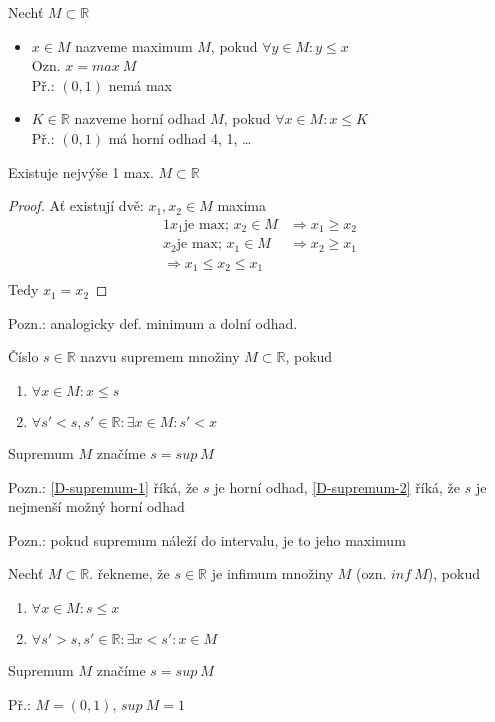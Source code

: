 \begin{definition}[Maximum]
	Nechť $M\subset\mathbb{R}$
	\begin{itemize}
		\item $x\in M$ nazveme maximum $M$, pokud $\forall y\in M: y\leq x$ \\
			Ozn. $x=max~M$ \\
			Př.: $(0,1)$ nemá max
		\item $K\in\mathbb{R}$ nazveme horní odhad $M$, pokud $\forall x\in M: x\leq K$ \\
			Př.: $(0,1)$ má horní odhad 4, 1, \dots
	\end{itemize}
\end{definition}

\begin{lemma}
	Existuje nejvýše 1 max. $M\subset\mathbb{R}$
\end{lemma}
\begin{proof}
	Ať existují dvě: $x_1, x_2\in M$ maxima
	\begin{alignat}{1}
		x_1 \text{je max; }x_2\in M &\Rightarrow x_1\geq x_2 \\
		x_2 \text{je max; }x_1\in M &\Rightarrow x_2\geq x_1 \\
		\Rightarrow x_1\leq x_2\leq x_1 \\
	\end{alignat}
	Tedy $x_1=x_2$
\end{proof}

Pozn.: analogicky def. minimum a dolní odhad.

\begin{definition}[Supremum]
	Číslo $s\in\mathbb{R}$ nazvu supremem množiny $M\subset\mathbb{R}$, pokud
	\begin{enumerate}[I]
		\item\label{D-supremum-1} $\forall x\in M: x\leq s$
		\item\label{D-supremum-2} $\forall s'<s, s'\in\mathbb{R}: \exists x\in M: s'<x$
	\end{enumerate}
	Supremum $M$ značíme $s=sup~M$
\end{definition}

Pozn.: \ref{D-supremum-1} říká, že $s$ je horní odhad, \ref{D-supremum-2} říká,
že $s$ je nejmenší možný horní odhad

Pozn.: pokud supremum náleží do intervalu, je to jeho maximum

\begin{definition}[Infinum]
	Nechť $M\subset\mathbb{R}$. řekneme, že $s\in\mathbb{R}$ je infimum množiny $M$
	(ozn. $inf~M$), pokud
	\begin{enumerate}[I]
		\item\label{D-infimum-1} $\forall x\in M: s\leq x$
		\item\label{D-infimum-2} $\forall s'>s, s'\in\mathbb{R}: \exists x<s': x\in M$
	\end{enumerate}
	Supremum $M$ značíme $s=sup~M$

	Př.: $M=(0,1)$, $sup~M=1$
\end{definition}




